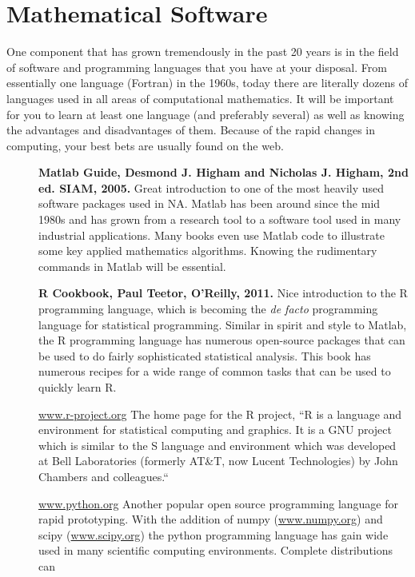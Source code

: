 \documentclass[11pt]{article}
\begin{document}
\section{Mathematical Software}
One component that has grown tremendously in the past 20 years is in the field of software and programming languages that you have at your disposal.  From essentially one language (Fortran) in the 1960s, today there are literally dozens of languages used in all areas of computational mathematics.  It will be important for you to learn at least one language (and preferably several) as well as knowing the advantages and disadvantages of them.  Because of the rapid changes in computing, your best bets are usually found on the web.

\begin{description}
\item[ ] {\bf Matlab Guide, Desmond J. Higham and Nicholas J. Higham, 2nd ed. SIAM, 2005.}  Great introduction to one of the most heavily used software packages used in NA.  Matlab has been around since the mid 1980s and has grown from a research tool to a software tool used in many industrial applications.  Many books even use Matlab code to illustrate some key applied mathematics algorithms.  Knowing the rudimentary commands in Matlab will be essential.


\item[ ] {\bf R Cookbook, Paul Teetor, O'Reilly, 2011.} Nice introduction to the R programming language, which is becoming the {\it de facto} programming language for statistical programming.  Similar in spirit and style to Matlab, the R programming language has numerous open-source packages that can be used to do fairly sophisticated statistical analysis.  This book has numerous recipes for a wide range of common tasks that can be used to quickly learn R.

\item[] {\url{www.r-project.org}} The home page for the R project, ``R is a language and environment for statistical computing and graphics. It is a GNU project which is similar to the S language and environment which was developed at Bell Laboratories (formerly AT\&T, now Lucent Technologies) by John Chambers and colleagues.``


\item[] {\url{www.python.org}} Another popular open source programming language for rapid prototyping.  With the addition of numpy (\url{www.numpy.org}) and scipy (\url{www.scipy.org}) the python programming language has gain wide used in many scientific computing environments.  Complete distributions can 

\end{description}
\end{document}
